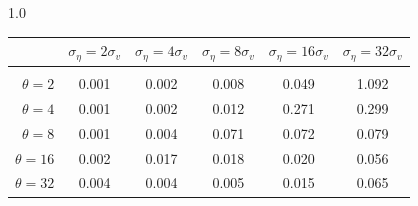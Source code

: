 \documentclass[12pt]{article}
\begin{document}
\begin{table}[h!]
\vspace{10pt}
\begin{subtable}{1.0\textwidth}
    \centering
\begin{tabular}{rccccc}
\hline  
            & \multicolumn{1}{l}{$\sigma_{\eta} =2\sigma_{v}$} & \multicolumn{1}{l}{$\sigma_{\eta} =4\sigma_{v}$} & \multicolumn{1}{l}{$\sigma_{\eta} =8\sigma_{v}$} & \multicolumn{1}{l}{$\sigma_{\eta} =16\sigma_{v}$} & \multicolumn{1}{l}{$\sigma_{\eta} =32\sigma_{v}$} \\ \hline  \vspace{-3mm} \\        
$\theta=2$  & 0.001                                             & 0.002                                             & 0.008                                             & 0.049                                              & 1.092                                              \\ \hline
$\theta=4$  & 0.001                                             & 0.002                                             & 0.012                                             & 0.271                                              & 0.299                                              \\ \hline
$\theta=8$  & 0.001                                             & 0.004                                             & 0.071                                             & 0.072                                              & 0.079                                              \\ \hline
$\theta=16$ & 0.002                                             & 0.017                                             & 0.018                                             & 0.020                                              & 0.056                                              \\ \hline
$\theta=32$ & 0.004                                             & 0.004                                             & 0.005                                             & 0.015                                              & 0.065                                              \\ \hline
\end{tabular}
\end{subtable}


\end{table}
\end{document}
